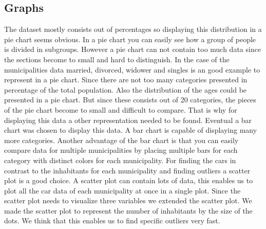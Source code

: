 \documentclass[a4paper,twoside,11pt]{article}
\begin{document}
\subsection{Graphs}
The dataset mostly consists out of percentages so displaying this distribution in a pie chart seems obvious. In a pie chart you can easily see how a group of people is divided in subgroups. However a pie chart can not contain too much data since the sections become to small and hard to distinguish. In the case of the municipalities data married, divorced, widower and singles is an good example to represent in a pie chart. Since there are not too many categories presented in percentage of the total population. \newline
Also the distribution of the ages could be presented in a pie chart. But since these consists out of 20 categories, the pieces of the pie chart become to small and difficult to compare. That is why for displaying this data a other representation needed to be found. Eventual a bar chart was chosen to display this data. A bar chart is capable of displaying many more categories. Another advantage of the bar chart is that you can easily compare data for multiple municipalities by placing multiple bars for each category with distinct colors for each municipality. \newline
For finding the cars in contrast to the inhabitants for each municipality and finding outliers a scatter plot is a good choice. A scatter plot can contain lots of data, this enables us to plot all the car data of each municipality at once in a single plot. Since the scatter plot needs to visualize three variables we extended the scatter plot. We made the scatter plot to represent the number of inhabitants by the size of the dots. We think that this enables us to find specific outliers very fast.
\end{document}
